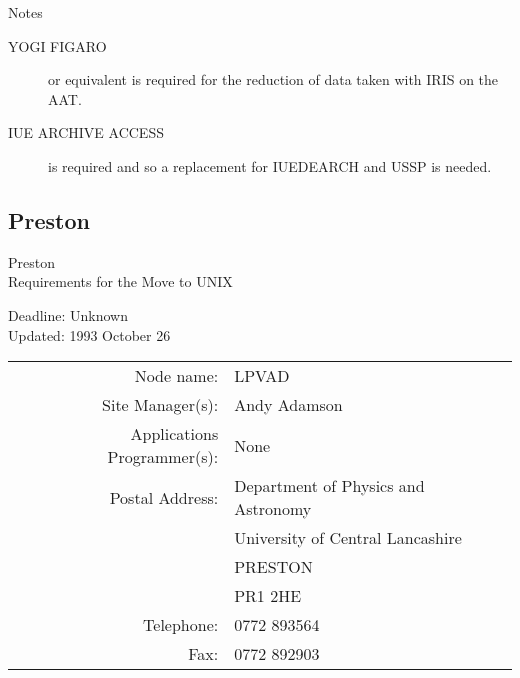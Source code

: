 \vspace{5mm}
\begin{center}
{\large\sc Notes}
\end{center}

\begin{description}
\item[YOGI FIGARO] or equivalent is required for the reduction of
data taken with IRIS on the AAT.
\item[IUE ARCHIVE ACCESS] is required and so a replacement for
IUEDEARCH and USSP is needed.
\end{description}


\newpage
\subsection{Preston}

\renewcommand{\starsitename}{Preston}
\renewcommand{\starnodename}{LPVAD}

\renewcommand{\starunixdate}{Unknown}
\renewcommand{\starupdate}{1993 October 26}

\renewcommand{\starsitetelephone}{0772 893564}
\renewcommand{\starsitefax}{0772 892903}

\begin{center}
{\Large\sc \starsitename \\ [2ex]
           Requirements for the Move to UNIX}

\vspace{3mm}
{\large\sc Deadline: \starunixdate \\ [1ex]
           Updated: \starupdate}
\end{center}

\vspace{5mm}

\begin{center}
\begin{tabular}{rl}
{\sc Node name:}                  & \starnodename \\
{\sc Site Manager(s):}            & Andy Adamson \\
{\sc Applications Programmer(s):} & None \\
{\sc Postal Address:}             & Department of Physics and Astronomy \\
                                  & University of Central Lancashire \\
                                  & PRESTON \\
                                  & PR1 2HE \\
{\sc Telephone:}                  & \starsitetelephone \\
{\sc Fax:}                        & \starsitefax \\
\end{tabular}
\end{center}

